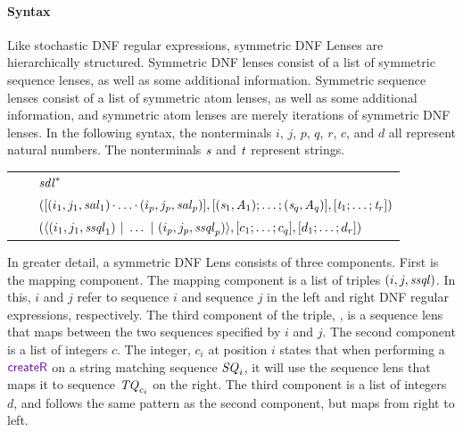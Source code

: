 \documentclass[acmsmall,screen,anonymous]{acmart}
\begin{document}
\paragraph*{Syntax}
Like stochastic DNF regular expressions, symmetric DNF Lenses are hierarchically
structured. Symmetric DNF lenses consist of a list of symmetric sequence lenses,
as well as some additional information. Symmetric sequence lenses consist of a
list of symmetric atom lenses, as well as some additional information, and
symmetric atom lenses are merely iterations of symmetric DNF lenses. In the
following syntax, the nonterminals $i$, $j$, $p$, $q$, $r$, $c$, and $d$ all
represent natural numbers. The nonterminals $\mathit{s}$ and $\mathit{t}$ represent
strings.
\begin{center}
  \begin{tabular}{@{}r@{\ }c@{}l@{}}
    \SAtomLens{} & \GEq{} & ${\mathit{sdl}}^*$ \\
    \SSQLens{} & \GEq{} & $([(i_1,j_1,\mathit{sal}_1)\mkern-1mu\cdot\mkern-1mu
                          \ldots\mkern-1mu\cdot\mkern-1mu
                          (i_p,j_p,\mathit{sal}_p)]
                          ,[ (\mathit{s}_1,\mathit{A}_1);\ldots;(\mathit{s}_q,\mathit{A}_q) ]
                          ,[ \mathit{t}_1;\ldots;\mathit{t}_r ])$ \\
    \SDNFLens{} & \GEq{} & $(\langle(i_1,j_1,\mathit{ssql}_1)~|~
                           \ldots~|~
                           (i_p,j_p,\mathit{ssql}_p)\rangle
                           ,[ c_1;\ldots;c_q ]
                           ,[ d_1;\ldots;d_r ])$ \\
  \end{tabular}
\end{center}

In greater detail, a symmetric DNF Lens \SDNFLens{} consists of three
components. First is the mapping component. The mapping component is a list of
triples $(i,j,\mathit{ssql})$. In this, $i$ and $j$ refer to sequence $i$ and
sequence $j$ in the left and right DNF regular expressions, respectively. The
third component of the triple, \SSQLens{}, is a sequence lens that maps between the two
sequences specified by $i$ and $j$. The second component is a list of integers
$c$. The integer, $c_i$ at position $i$ states that when performing a $\CreateR$
on a string matching sequence $\mathit{SQ}_i$, it will use the sequence lens that
maps it to sequence $\mathit{TQ}_{c_i}$ on the right. The third component is a
list of integers $d$, and follows the same pattern as the second component, but
maps from right to left.
\end{document}

